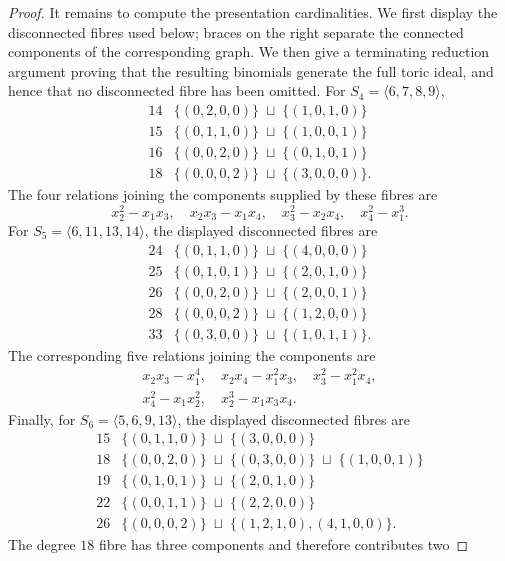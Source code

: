 \documentclass[10pt]{amsart}
\theoremstyle{plain}
\begin{document}
\begin{proof}
It remains to compute the presentation cardinalities.  We first display the
disconnected fibres used below; braces on the right separate the connected
components of the corresponding graph.  We then give a terminating reduction argument proving that the resulting binomials generate the full toric
ideal, and hence that no disconnected fibre has been omitted.  For
\(S_4=\langle6,7,8,9\rangle\),
\[
\begin{array}{c|c}
14 & \{(0,2,0,0)\}\;\sqcup\;\{(1,0,1,0)\}\phantom{.}\\
15 & \{(0,1,1,0)\}\;\sqcup\;\{(1,0,0,1)\}\phantom{.}\\
16 & \{(0,0,2,0)\}\;\sqcup\;\{(0,1,0,1)\}\phantom{.}\\
18 & \{(0,0,0,2)\}\;\sqcup\;\{(3,0,0,0)\}.
\end{array}
\]
The four relations joining the components supplied by these fibres are
\[
x_2^2-x_1x_3,\quad
x_2x_3-x_1x_4,\quad
x_3^2-x_2x_4,\quad
x_4^2-x_1^3.
\]
For \(S_5=\langle6,11,13,14\rangle\), the displayed disconnected fibres are
\[
\begin{array}{c|c}
24 & \{(0,1,1,0)\}\;\sqcup\;\{(4,0,0,0)\}\phantom{.}\\
25 & \{(0,1,0,1)\}\;\sqcup\;\{(2,0,1,0)\}\phantom{.}\\
26 & \{(0,0,2,0)\}\;\sqcup\;\{(2,0,0,1)\}\phantom{.}\\
28 & \{(0,0,0,2)\}\;\sqcup\;\{(1,2,0,0)\}\phantom{.}\\
33 & \{(0,3,0,0)\}\;\sqcup\;\{(1,0,1,1)\}.
\end{array}
\]
The corresponding five relations joining the components are
\[
\begin{gathered}
x_2x_3-x_1^4,\quad x_2x_4-x_1^2x_3,\quad x_3^2-x_1^2x_4,\\
x_4^2-x_1x_2^2,\quad x_2^3-x_1x_3x_4.
\end{gathered}
\]
Finally, for \(S_6=\langle5,6,9,13\rangle\), the displayed disconnected
fibres are
\[
\begin{array}{c|c}
15 & \{(0,1,1,0)\}\;\sqcup\;\{(3,0,0,0)\}\\
18 & \{(0,0,2,0)\}\;\sqcup\;\{(0,3,0,0)\}\;\sqcup\;\{(1,0,0,1)\}\\
19 & \{(0,1,0,1)\}\;\sqcup\;\{(2,0,1,0)\}\\
22 & \{(0,0,1,1)\}\;\sqcup\;\{(2,2,0,0)\}\\
26 & \{(0,0,0,2)\}\;\sqcup\;\{(1,2,1,0),(4,1,0,0)\}.
\end{array}
\]
The degree \(18\) fibre has three components and therefore contributes two

\end{proof}
\end{document}
